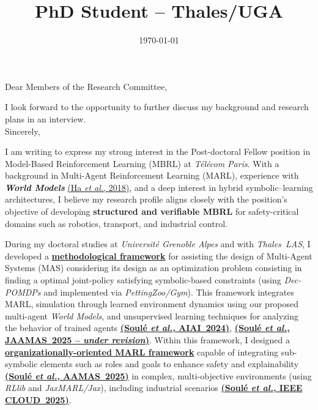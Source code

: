 \documentclass[11pt,a4paper,sans]{moderncv}
\title{PhD Student -- Thales/UGA}
\begin{document}
\date{\today}
\opening{Dear Members of the Research Committee,}
\closing{{I look forward to the opportunity to further discuss my background and research plans in an interview.}\\[0.6cm]Sincerely,\vspace{-0.6cm}}

\makelettertitle

\justifying

I am writing to express my strong interest in the Post-doctoral Fellow position in Model-Based Reinforcement Learning (MBRL) at \textit{\textit{Télécom Paris}}. With a background in Multi-Agent Reinforcement Learning (MARL), experience with \textit{\textbf{World Models}} \href{https://link.springer.com/chapter/10.1007/978-3-031-63223-5_24}{(Ha \textit{et al.}, 2018)}, and a deep interest in hybrid symbolic–learning architectures, I believe my research profile aligns closely with the position’s objective of developing \textbf{structured and verifiable MBRL} for safety-critical domains such as robotics, transport, and industrial control.

During my doctoral studies at \textit{Université Grenoble Alpes} and with \textit{Thales~LAS}, I developed a \href{https://github.com/julien6/CybMASDE}{\textbf{methodological framework}} for assisting the design of Multi-Agent Systems (MAS) considering its design as an optimization problem consisting in finding a optimal joint-policy satisfying symbolic-based constraints (using \textit{Dec-POMDPs} and implemented via \textit{PettingZoo/Gym}). This framework integrates MARL, simulation through learned environment dynamics using our proposed multi-agent \textit{World Models}, and unsupervised learning techniques for analyzing the behavior of trained agents \href{https://link.springer.com/chapter/10.1007/978-3-031-63223-5_24}{\textbf{(Soulé \textit{et al.}, AIAI~2024)}}, \href{https://sciety-labs.elifesciences.org/articles/by?article_doi=10.21203/rs.3.rs-7166037/v1}{\textbf{(Soulé \textit{et al.}, JAAMAS~2025 -- \textit{under revision})}}. Within this framework, I designed a \href{https://github.com/julien6/MOISE-MARL}{\textbf{organizationally-oriented MARL framework}} capable of integrating sub-symbolic elements such as roles and goals to enhance safety and explainability \href{https://arxiv.org/abs/2503.23615}{\textbf{(Soulé \textit{et al.}, AAMAS~2025)}} in complex, multi-objective environments (using \textit{RLlib} and \textit{JaxMARL/Jax}), including industrial scenarios \href{https://arxiv.org/abs/2505.21559}{\textbf{(Soulé \textit{et al.}, IEEE CLOUD~2025)}}.
\end{document}
